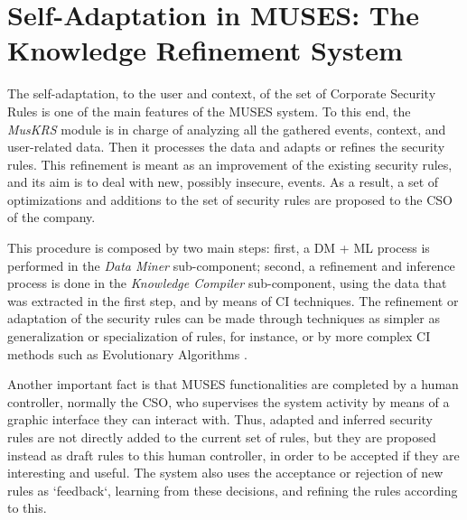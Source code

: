 
\section{Self-Adaptation in MUSES: The Knowledge Refinement System}

The self-adaptation, to the user and context, of the set of Corporate Security Rules is one of the main features of the MUSES system.
To this end, the \textit{MusKRS} module is in charge of analyzing all the gathered events, context, and user-related data. Then it processes the data and adapts or refines the security rules. This refinement is meant as an improvement of the existing security rules, and its aim is to deal with new, possibly insecure, events. As a result, a set of optimizations and additions to the set of security rules are proposed to the CSO of the company.

This procedure is composed by two main steps: first, a DM \cite{DataMining_Lee01} + ML \cite{MachineLearning_Bishop06} process is performed in the \textit{Data Miner} sub-component; second, a refinement and inference process is done in the \textit{Knowledge Compiler} sub-component, using the data that was extracted in the first step, and by means of CI techniques.
The refinement or adaptation of the security rules can be made through techniques as simpler as generalization or specialization of rules, for instance, or by more complex CI methods such as Evolutionary Algorithms \cite{EAs_Back96}.

Another important fact is that MUSES functionalities are completed by a human controller, normally the CSO, who supervises the system activity by means of a graphic interface they can interact with. 
Thus, adapted and inferred security rules are not directly added to the current set of rules, but they are proposed instead as draft rules to this human controller, in order to be accepted if they are interesting and useful. The system also uses the acceptance or rejection of new rules as `feedback`, learning from these decisions, and refining the rules according to this.


